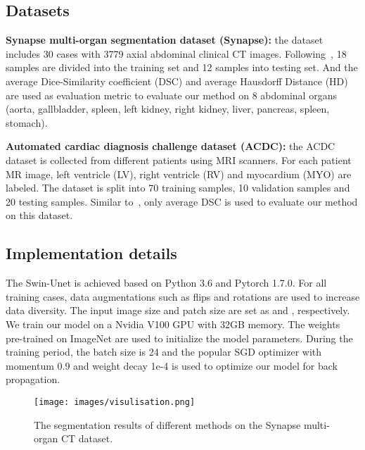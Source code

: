 \documentclass[runningheads]{llncs}
\begin{document}
\subsection{Datasets}
\textbf{Synapse multi-organ segmentation dataset (Synapse):} the dataset includes 30 cases with 3779 axial abdominal clinical CT images. Following~\cite{trans-unet,domain_adaptive}, 18 samples are divided into the training set and 12 samples into testing set. And the average Dice-Similarity coefficient (DSC) and average Hausdorff Distance (HD) are used as evaluation metric to evaluate our method on 8 abdominal organs (aorta, gallbladder, spleen, left kidney, right kidney, liver, pancreas, spleen, stomach). 



\textbf{Automated cardiac diagnosis challenge dataset (ACDC):} the ACDC dataset is collected from different patients using MRI scanners. For each patient MR image, left ventricle (LV), right ventricle (RV) and myocardium (MYO) are labeled. The dataset is split into 70 training samples, 10 validation samples and 20 testing samples. Similar to~\cite{trans-unet}, only average DSC is used to evaluate our method on this dataset. 



\subsection{Implementation details}

The Swin-Unet is achieved based on Python 3.6 and Pytorch 1.7.0. For all training cases, data augmentations such as flips and rotations are used to increase data diversity. The input image size and patch size are set as  and , respectively. We train our model on a Nvidia V100 GPU with 32GB memory. The weights pre-trained on ImageNet are used to initialize the model parameters. During the training period, the batch size is 24 and the popular SGD optimizer with momentum 0.9 and weight decay 1e-4 is used to optimize our model for back propagation. 

\begin{figure}[t!]
\texttt{[image: images/visulisation.png]}
\caption{The segmentation results of different methods on the Synapse multi-organ CT dataset.} \label{segmentation}
\end{figure}
\end{document}
